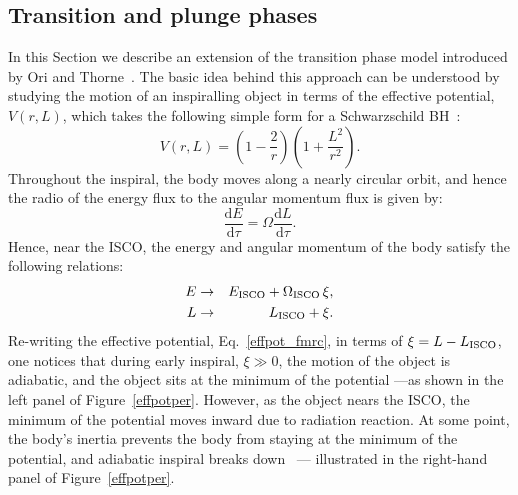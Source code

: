\subsection{Transition and plunge phases}
\label{trans}
In this Section we describe an extension of the transition phase model introduced by Ori and Thorne~\cite{amos}. The basic idea behind this approach can be understood by studying the motion of an inspiralling object in terms of the effective potential, \(V(r, L)\), which takes the following simple form for  a Schwarzschild BH~\cite{mtw}:
\begin{equation}
V(r, L) = \left(1-\frac{2}{r} \right)\left(1+ \frac{L^2}{r^2}\right).
\label{effpot_fmrc}
\end{equation} 
\noindent Throughout the inspiral, the body moves along a nearly circular orbit, and hence the radio of the energy flux to the angular momentum flux is given by:
\begin{equation}
 \frac{{\mathrm{d}}E}{{\mathrm{d}}\tau} = \Omega  \frac{{\mathrm{d}}L}{{\mathrm{d}}\tau}.
 \label{radII}
 \end{equation}
\noindent Hence, near the ISCO, the energy and angular momentum of the body satisfy the following relations:
\begin{eqnarray}
\label{ener_emri}
E & \rightarrow & E_{\rm{ISCO}} + \Omega_{\rm{ISCO}}\, \xi,\\
\label{ang_emri}
L  & \rightarrow & L_{\rm{ISCO}}+  \xi.
\end{eqnarray}
\noindent Re-writing the effective potential, Eq.~\eqref{effpot_fmrc}, in terms of \(\xi = L-L_{\rm{ISCO}}\), one notices that during early inspiral, \(\xi \gg0\), the motion of the object is adiabatic, and the object sits at the minimum of the potential ---as shown in the left panel of Figure~\ref{effpotper}. However, as the object nears the ISCO, the minimum of the potential moves inward due to radiation reaction. At some point, the body's inertia prevents the body from staying at the minimum of the potential, and adiabatic inspiral breaks down~\cite{amos} --- illustrated in the right-hand panel of Figure~\ref{effpotper}.


